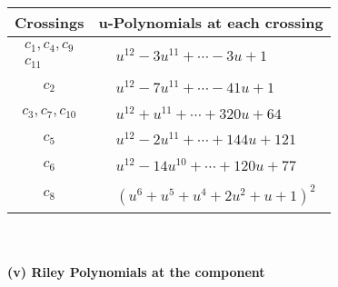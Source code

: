 \documentclass[1p]{elsarticle_modified}
\theoremstyle{definition}
\begin{document}
\begin{tabular}{m{50pt}|m{274pt}}
Crossings & \hspace{64pt}u-Polynomials at each crossing \\
\hline $$\begin{aligned}c_{1},c_{4},c_{9}\\c_{11}\end{aligned}$$&$\begin{aligned}
&u^{12}-3 u^{11}+\cdots-3 u+1
\end{aligned}$\\
\hline $$\begin{aligned}c_{2}\end{aligned}$$&$\begin{aligned}
&u^{12}-7 u^{11}+\cdots-41 u+1
\end{aligned}$\\
\hline $$\begin{aligned}c_{3},c_{7},c_{10}\end{aligned}$$&$\begin{aligned}
&u^{12}+u^{11}+\cdots+320 u+64
\end{aligned}$\\
\hline $$\begin{aligned}c_{5}\end{aligned}$$&$\begin{aligned}
&u^{12}-2 u^{11}+\cdots+144 u+121
\end{aligned}$\\
\hline $$\begin{aligned}c_{6}\end{aligned}$$&$\begin{aligned}
&u^{12}-14 u^{10}+\cdots+120 u+77
\end{aligned}$\\
\hline $$\begin{aligned}c_{8}\end{aligned}$$&$\begin{aligned}
&(u^6+u^5+u^4+2 u^2+u+1)^2
\end{aligned}$\\
\hline
\end{tabular}\\~\\
\newpage\renewcommand{\arraystretch}{1}
\flushleft \textbf{(v) Riley Polynomials at the component}\newline \\
\end{document}
